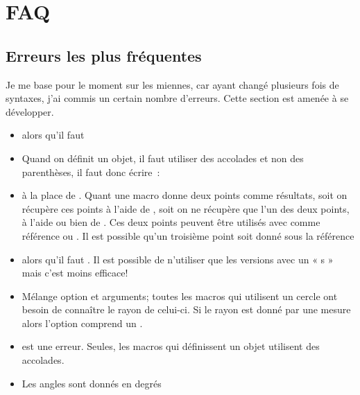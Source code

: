 
\section{FAQ} 
\subsection{Erreurs les plus fréquentes}
 Je me base pour le moment sur les miennes, car ayant changé plusieurs fois de syntaxes, j'ai commis un certain nombre d'erreurs. Cette section est amenée à se développer.
 
 \begin{itemize}\setlength{\itemsep}{10pt}
  \item {} alors qu'il faut  
  \item  {} Quand on définit un objet, il faut utiliser des accolades et non des parenthèses, il faut donc écrire~: 
  
    \item {} à la place de . Quant une macro donne deux points comme résultats, soit on récupère ces points  à l'aide de , soit on ne récupère que l'un des deux points, à l'aide   ou bien de . Ces deux points peuvent être utilisés avec comme référence  ou  . Il est possible qu'un troisième point soit donné sous la référence   
     
  \item {} alors qu'il faut  . Il est possible de n'utiliser que les versions avec un « s » mais c'est moins efficace!
  \item Mélange option et arguments; toutes les macros  qui utilisent un cercle ont besoin de connaître le rayon de celui-ci. Si le rayon est donné par une mesure alors l'option comprend un .

\item  {} est une erreur. Seules, les macros qui définissent un objet utilisent des accolades.   
  \item Les angles sont donnés en degrés 
  

\end{itemize}
